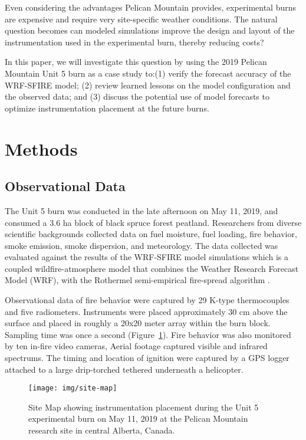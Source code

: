 \documentclass[preprints,article,accept,moreauthors,pdftex]{Definitions/mdpi}
\begin{document}
Even considering the advantages Pelican Mountain provides, experimental burns are expensive and require very site-specific weather conditions. The natural question becomes can modeled simulations improve the design and layout of the instrumentation used in the experimental burn, thereby reducing costs?

In this paper, we will investigate this question by using the 2019 Pelican Mountain Unit 5 burn as a case study to:(1) verify the forecast accuracy of the WRF-SFIRE model; (2) review learned lessons on the model configuration and the observed data; and (3) discuss the potential use of model forecasts to optimize instrumentation placement at the future burns.

\section{Methods}
\subsection{Observational Data}

The Unit 5 burn was conducted in the late afternoon on May 11, 2019, and consumed a 3.6 ha block of black spruce forest peatland. Researchers from diverse scientific backgrounds collected data on fuel moisture, fuel loading, fire behavior, smoke emission, smoke dispersion, and meteorology. The data collected was evaluated against the results of the WRF-SFIRE model simulations which is a coupled wildfire-atmosphere model that combines the Weather Research Forecast Model (WRF), with the Rothermel semi-empirical fire-spread algorithm \cite{mandel_coupled_2011,mandel_recent_2014}.

Observational data of fire behavior were captured by 29 K-type thermocouples and five radiometers. Instruments were placed approximately 30 cm above the surface and placed in roughly a 20x20 meter array within the burn block. Sampling time was once a second (Figure~\ref{fig1}). Fire behavior was also monitored by ten in-fire video cameras, Aerial footage captured visible and infrared spectrums. The timing and location of ignition were captured by a GPS logger attached to a large drip-torched tethered underneath a helicopter.


\begin{figure}[H]
\centering
 \texttt{[image: img/site-map]}
 \caption{Site Map showing instrumentation placement during the Unit 5 experimental burn on May 11, 2019 at the Pelican Mountain research site in central Alberta, Canada. \label{fig1}}
 \end{figure}
\end{document}
